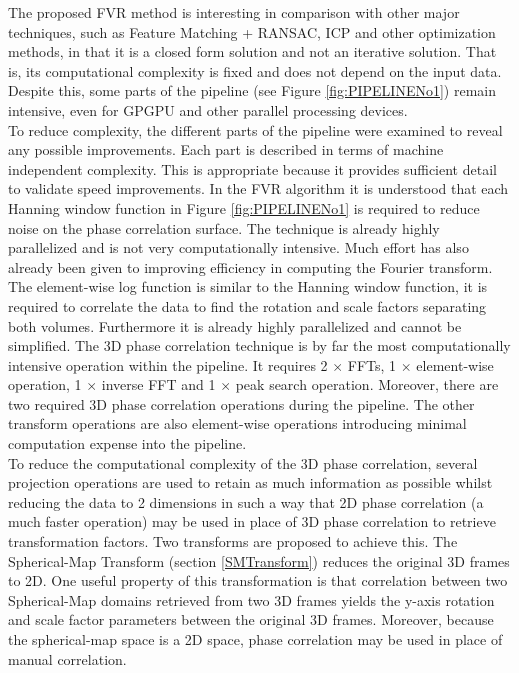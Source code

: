 
The proposed FVR method is interesting in comparison with other major techniques, such as Feature Matching + RANSAC, ICP and other optimization methods, in that it is a closed form solution and not an iterative solution. That is, its computational complexity is fixed and does not depend on the input data. Despite this, some parts of the pipeline (see Figure \ref{fig:PIPELINENo1}) remain intensive, even for GPGPU and other parallel processing devices. \\

To reduce complexity, the different parts of the pipeline were examined to reveal any possible improvements. Each part is described in terms of machine independent complexity. This is appropriate because it provides sufficient detail to validate speed improvements. In the FVR algorithm it is understood that each Hanning window function in Figure \ref{fig:PIPELINENo1} is required to reduce noise on the phase correlation surface. The technique is already highly parallelized and is not very computationally intensive. Much effort has also already been given to improving efficiency in computing the Fourier transform. \\

The element-wise log function is similar to the Hanning window function, it is required to correlate the data to find the rotation and scale factors separating both volumes. Furthermore it is already highly parallelized and cannot be simplified. The 3D phase correlation technique is by far the most computationally intensive operation within the pipeline. It requires 2 $\times$ FFTs, 1 $\times$ element-wise operation, 1 $\times$ inverse FFT and 1 $\times$ peak search operation. Moreover, there are two required 3D phase correlation operations during the pipeline. The other transform operations are also element-wise operations introducing minimal computation expense into the pipeline. \\

To reduce the computational complexity of the 3D phase correlation, several projection operations are used to retain as much information as possible whilst reducing the data to 2 dimensions in such a way that 2D phase correlation (a much faster operation) may be used in place of 3D phase correlation to retrieve transformation factors. Two transforms are proposed to achieve this. The Spherical-Map Transform (section \ref{SMTransform}) reduces the original 3D frames to 2D. One useful property of this transformation is that correlation between two Spherical-Map domains retrieved from two 3D frames yields the y-axis rotation and scale factor parameters between the original 3D frames. Moreover, because the spherical-map space is a 2D space, phase correlation may be used in place of manual correlation.  \\

